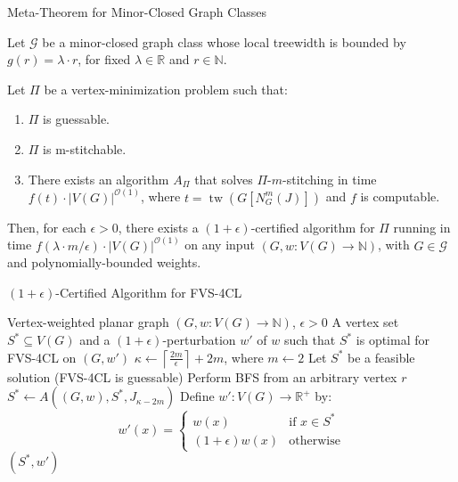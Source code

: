 \documentclass{beamer}
\newcommand{\tw}{\operatorname{tw}}
\begin{document}
\begin{frame}{Meta-Theorem for Minor-Closed Graph Classes}
\begin{definition}
Let $\mathcal{G}$ be a minor-closed graph class whose local treewidth is bounded by $g(r) = \lambda \cdot r$, for fixed $\lambda \in \mathbb{R}$ and $r \in \mathbb{N}$.

Let $\Pi$ be a vertex-minimization problem such that:
\begin{enumerate}
    \item $\Pi$ is guessable.
    \item $\Pi$ is m-stitchable.
    \item There exists an algorithm $A_\Pi$ that solves $\Pi$-$m$-stitching in time 
    $f(t) \cdot |V(G)|^{\mathcal{O}(1)}$, where $t = \tw(G[N_G^m(J)])$ and $f$ is computable.
\end{enumerate}

Then, for each $\epsilon > 0$, there exists a $(1 + \epsilon)$-certified algorithm for $\Pi$ 
running in time $f(\lambda \cdot m / \epsilon) \cdot |V(G)|^{\mathcal{O}(1)}$ on any input 
$(G, w : V(G) \to \mathbb{N})$, with $G \in \mathcal{G}$ and polynomially-bounded weights.
\end{definition}
\end{frame}

\begin{frame}[fragile]{{$(1+\epsilon)$}-Certified Algorithm for FVS-4CL}
  \begin{algorithm}[H]
    \caption{$(1+\epsilon)$-Certified algorithm for FVS-4CL}
    \begin{algorithmic}[1]
    \REQUIRE Vertex-weighted planar graph $(G, w:V(G) \to \mathbb{N})$, $\epsilon > 0$
    \ENSURE A vertex set $S^* \subseteq V(G)$ and a $(1+\epsilon)$-perturbation $w'$ of $w$ such that $S^*$ is optimal for FVS-4CL on $(G, w')$
    \STATE $\kappa \leftarrow \left\lceil \frac{2m}{\epsilon} \right\rceil + 2m$, where $m \leftarrow 2$
    \STATE Let $S^*$ be a feasible solution (FVS-4CL is guessable)
    \STATE Perform BFS from an arbitrary vertex $r$
        \STATE $S^* \leftarrow A((G,w), S^*, J_{\kappa-2m})$
    \ENDWHILE
    \STATE Define $w': V(G) \rightarrow \mathbb{R}^+$ by:
    \[
    w'(x) = 
    \begin{cases}
    w(x) & \text{if } x \in S^* \\
    (1 + \epsilon)w(x) & \text{otherwise}
    \end{cases}
    \]
    \RETURN $(S^*, w')$
    \end{algorithmic}
  \end{algorithm}
\end{frame}
\end{document}
